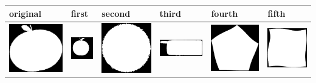 \begin{table}[h!]
  \centering
  \begin{tabular}{ | m{2.2cm} | m{2.2cm} | m{2.2cm} | m{2.2cm} | m{2.2cm} | m{2.2cm} | }
    \hline
    original & first & second & third & fourth & fifth \\
	\hline
    \begin{minipage}{.3\textwidth}
      \includegraphics[width=\linewidth, width=20mm]{images/test-apple}
    \end{minipage}
    &
    \begin{minipage}{.3\textwidth}
      \includegraphics[width=\linewidth, width=20mm]{images/apple-1}
    \end{minipage}
    & 
    \begin{minipage}{.3\textwidth}
      \includegraphics[width=\linewidth, width=20mm]{images/device9}
    \end{minipage}
	&
	\begin{minipage}{.3\textwidth}
      \includegraphics[width=\linewidth, width=20mm]{images/cellular_phone}
    \end{minipage}
	&
    \begin{minipage}{.3\textwidth}
      \includegraphics[width=\linewidth, width=20mm]{images/device6}
    \end{minipage}
	&
    \begin{minipage}{.3\textwidth}
      \includegraphics[width=\linewidth, width=20mm]{images/device3}

\end{minipage}
\end{tabular}
\end{table}
